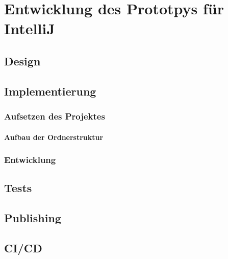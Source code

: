 \chapter{Entwicklung des Prototpys für IntelliJ}
\label{cha:EntwicklungIntelliJ}

\section{Design}
\label{sec:EntwicklungIntelliJ_Design}

\section{Implementierung}
\label{sec:EntwicklungIntelliJ_Implementierung}

\subsection{Aufsetzen des Projektes}

\subsubsection{Aufbau der Ordnerstruktur}

\subsection{Entwicklung}

\section{Tests}
\label{sec:EntwicklungIntelliJ_Tests}

\section{Publishing}
\label{sec:EntwicklungIntelliJ_Publishing}

\section{CI/CD}
\label{sec:EntwicklungIntelliJ_CICD}